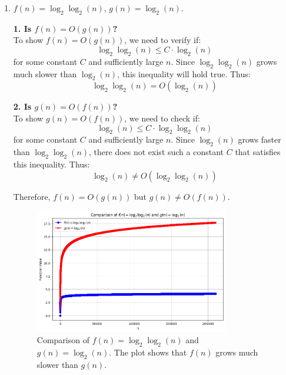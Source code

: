 \documentclass[letter]{article}
\theoremstyle{definition}
\newenvironment{soln}{
	\leavevmode\color{black}\ignorespaces
}{}
\begin{document}
\begin{enumerate}
                

    		
		\item 	$f(n) =  \log_{2}\log_{2}(n)$, $g(n) = \log_{2}(n)$.\\
		\begin{soln}
            
            \textbf{1. Is $f(n) = O(g(n))$?}\\
            To show $f(n) = O(g(n))$, we need to verify if:
            \[
            \log_{2} \log_{2}(n) \leq C \cdot \log_{2}(n)
            \]
            for some constant $C$ and sufficiently large $n$. Since $\log_{2} \log_{2}(n)$ grows much slower than $\log_{2}(n)$, this inequality will hold true. Thus:
            \[
            \log_{2} \log_{2}(n) = O(\log_{2}(n))
            \]
            
            \textbf{2. Is $g(n) = O(f(n))$?}\\
            To show $g(n) = O(f(n))$, we need to check if:
            \[
            \log_{2}(n) \leq C \cdot \log_{2} \log_{2}(n)
            \]
            for some constant $C$ and sufficiently large $n$. Since $\log_{2}(n)$ grows faster than $\log_{2} \log_{2}(n)$, there does not exist such a constant $C$ that satisfies this inequality. Thus:
            \[
            \log_{2}(n) \neq O(\log_{2} \log_{2}(n))
            \]
            
            Therefore, $f(n) = O(g(n))$ but $g(n) \neq O(f(n))$.
            \end{soln}

            \begin{figure}[H]
                \centering
                \includegraphics[width=0.8\textwidth]{big-o-2.png} %
                \caption{Comparison of $f(n) = \log_{2} \log_{2}(n)$ and $g(n) = \log_{2}(n)$. The plot shows that $f(n)$ grows much slower than $g(n)$.}
                \label{fig:log2_log2_vs_log2}
            \end{figure}


\end{enumerate}
\end{document}
